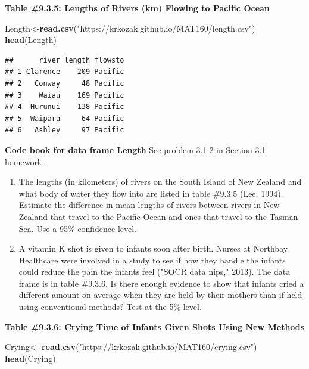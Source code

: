 \documentclass[
]{book}
\newenvironment{Shaded}{\begin{snugshade}}{\end{snugshade}}
\newcommand{\KeywordTok}[1]{\textcolor[rgb]{0.13,0.29,0.53}{\textbf{#1}}}
\newcommand{\NormalTok}[1]{#1}
\newcommand{\StringTok}[1]{\textcolor[rgb]{0.31,0.60,0.02}{#1}}
\begin{document}
\textbf{Table \#9.3.5: Lengths of Rivers (km) Flowing to Pacific Ocean}

\begin{Shaded}
\begin{Highlighting}[]
\NormalTok{Length<-}\KeywordTok{read.csv}\NormalTok{(}\StringTok{"https://krkozak.github.io/MAT160/length.csv"}\NormalTok{)}
\KeywordTok{head}\NormalTok{(Length)}
\end{Highlighting}
\end{Shaded}

\begin{verbatim}
##      river length flowsto
## 1 Clarence    209 Pacific
## 2   Conway     48 Pacific
## 3    Waiau    169 Pacific
## 4  Hurunui    138 Pacific
## 5  Waipara     64 Pacific
## 6   Ashley     97 Pacific
\end{verbatim}

\textbf{Code book for data frame Length} See problem 3.1.2 in Section 3.1 homework.

\begin{enumerate}
\def\labelenumi{\arabic{enumi}.}
\setcounter{enumi}{5}
\item
  The lengths (in kilometers) of rivers on the South Island of New Zealand and what body of water they flow into are listed in table \#9.3.5 (Lee, 1994). Estimate the difference in mean lengths of rivers between rivers in New Zealand that travel to the Pacific Ocean and ones that travel to the Tasman Sea. Use a 95\% confidence level.
\item
  A vitamin K shot is given to infants soon after birth. Nurses at Northbay Healthcare were involved in a study to see if how they handle the infants could reduce the pain the infants feel ("SOCR data nips," 2013). The data frame is in table \#9.3.6. Is there enough evidence to show that infants cried a different amount on average when they are held by their mothers than if held using conventional methods? Test at the 5\% level.
\end{enumerate}

\textbf{Table \#9.3.6: Crying Time of Infants Given Shots Using New Methods}

\begin{Shaded}
\begin{Highlighting}[]
\NormalTok{Crying<-}\StringTok{ }\KeywordTok{read.csv}\NormalTok{(}\StringTok{"https://krkozak.github.io/MAT160/crying.csv"}\NormalTok{)}
\KeywordTok{head}\NormalTok{(Crying)}
\end{Highlighting}
\end{Shaded}
\end{document}
